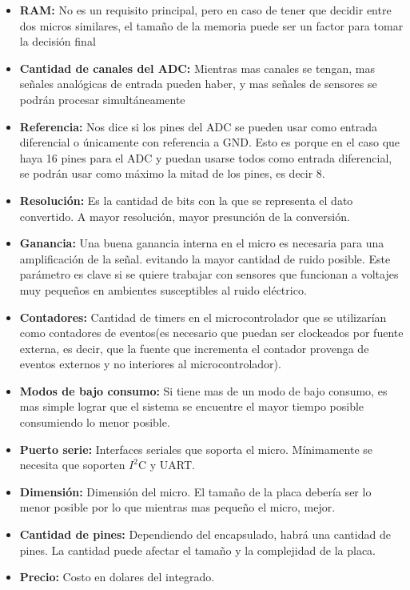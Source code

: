 \begin{itemize}
  \item \textbf{RAM:} No es un requisito principal, pero en caso de tener que decidir entre dos micros similares, el tama\~no de la memoria puede ser un factor para tomar la decisi\'on final
  \item \textbf{Cantidad de canales del ADC:} Mientras mas canales se tengan, mas se\~nales anal\'ogicas de entrada pueden haber, y mas se\~nales de sensores se podr\'an procesar simult\'aneamente
  \item \textbf{Referencia:} Nos dice si los pines del ADC se pueden usar como entrada diferencial o \'unicamente con referencia a GND. Esto es porque en el caso que haya 16 pines para el ADC y puedan usarse todos como entrada diferencial, se podr\'an usar como m\'aximo la mitad de los pines, es decir 8.
  \item \textbf{Resoluci\'on:} Es la cantidad de bits con la que se representa el dato convertido. A mayor resoluci\'on, mayor presunci\'on de la conversi\'on.
  \item \textbf{Ganancia:} Una buena ganancia interna en el micro es necesaria para una amplificaci\'on de la se\~nal.  evitando la mayor cantidad de ruido posible. Este par\'ametro es clave si se quiere trabajar con sensores que funcionan a voltajes muy peque\~nos en ambientes susceptibles al ruido el\'ectrico.
  \item \textbf{Contadores:} Cantidad de timers en el microcontrolador que se utilizar\'ian como contadores de eventos(es necesario que puedan ser clockeados por fuente externa, es decir, que la fuente que incrementa el contador provenga de eventos externos y no interiores al microcontrolador).
  \item \textbf{Modos de bajo consumo:} Si tiene mas de un modo de bajo consumo, es mas simple lograr que el sistema se encuentre el mayor tiempo posible consumiendo lo menor posible.
  \item \textbf{Puerto serie:} Interfaces seriales que soporta el micro. M\'inimamente se necesita que soporten $I^{2}$C y UART.
  \item \textbf{Dimensi\'on:} Dimensi\'on del micro. El tama\~no de la placa deber\'ia ser lo menor posible por lo que mientras mas peque\~no el micro, mejor.
  \item \textbf{Cantidad de pines:} Dependiendo del encapsulado, habr\'a una cantidad de pines. La cantidad puede afectar el tama\~no y la complejidad de la placa.
  \item \textbf{Precio:} Costo en dolares del integrado.
\end{itemize}

